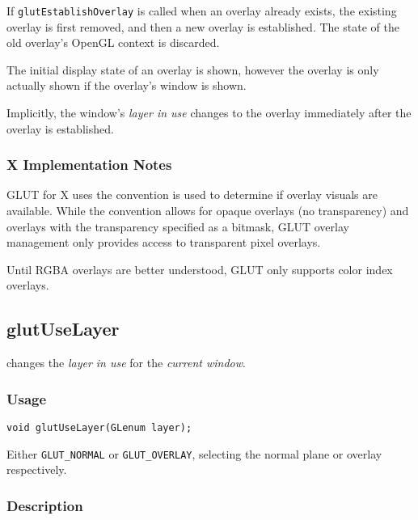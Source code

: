 If {\tt glutEstablishOverlay}
is called when an overlay already exists, the existing overlay is first
removed, and then a new overlay is established.  The state of the old overlay's
OpenGL context is discarded.

The initial display state of an overlay is shown, however the overlay
is only actually shown if the overlay's window is shown.

Implicitly, the window's {\em layer in use} changes to the overlay immediately
after the overlay is established.

\subsubsection*{X Implementation Notes}

GLUT for X uses the  convention \cite{kilgard93-layers}
is used to determine if overlay visuals are available.  While the convention
allows for opaque overlays (no transparency) and overlays with the transparency
specified as a bitmask, GLUT overlay management only provides access to transparent
pixel overlays.

Until RGBA overlays are better understood, GLUT only supports color index overlays.

\subsection{glutUseLayer}

 changes the {\em layer in use} for the {\em current window}.

\subsubsection*{Usage}

\begin{verbatim}
void glutUseLayer(GLenum layer);
\end{verbatim}
\begin{description}
\itemsep 0in
\item[{\tt layer}]
Either {\tt GLUT\_NORMAL} or {\tt GLUT\_OVERLAY}, selecting the normal plane or
overlay respectively.
\end{description}

\subsubsection*{Description}


